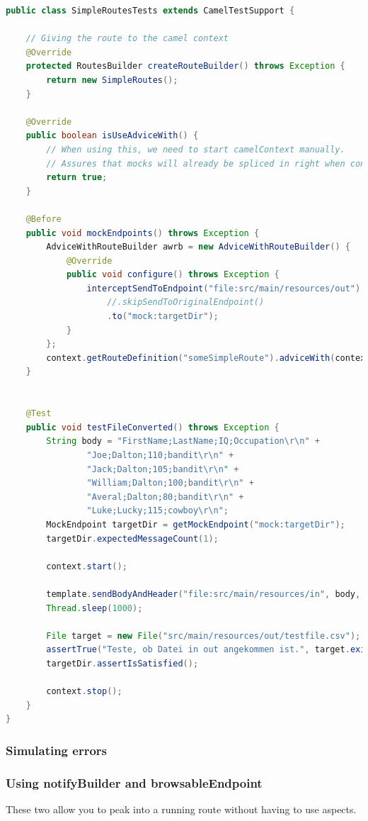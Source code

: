 \begin{lstlisting}[language=java]
public class SimpleRoutesTests extends CamelTestSupport {
	
	// Giving the route to the camel context
	@Override
	protected RoutesBuilder createRouteBuilder() throws Exception {
		return new SimpleRoutes();
	}
	
	@Override
	public boolean isUseAdviceWith() {
		// When using this, we need to start camelContext manually.
		// Assures that mocks will already be spliced in right when context starts.
		return true; 
	}
	
	@Before
	public void mockEndpoints() throws Exception {
		AdviceWithRouteBuilder awrb = new AdviceWithRouteBuilder() {
			@Override
			public void configure() throws Exception {
				interceptSendToEndpoint("file:src/main/resources/out")
					//.skipSendToOriginalEndpoint()
					.to("mock:targetDir");
			}
		};
		context.getRouteDefinition("someSimpleRoute").adviceWith(context, awrb);
	}
	
	
	@Test
	public void testFileConverted() throws Exception {
		String body = "FirstName;LastName;IQ;Occupation\r\n" + 
				"Joe;Dalton;110;bandit\r\n" + 
				"Jack;Dalton;105;bandit\r\n" + 
				"William;Dalton;100;bandit\r\n" + 
				"Averal;Dalton;80;bandit\r\n" + 
				"Luke;Lucky;115;cowboy\r\n";
		MockEndpoint targetDir = getMockEndpoint("mock:targetDir");
		targetDir.expectedMessageCount(1);
		
		context.start();
		
		template.sendBodyAndHeader("file:src/main/resources/in", body, Exchange.FILE_NAME, "testfile.csv");
		Thread.sleep(1000);
		
		File target = new File("src/main/resources/out/testfile.csv");
		assertTrue("Teste, ob Datei in out angekommen ist.", target.exists());
		targetDir.assertIsSatisfied();
		
		context.stop();
	}
}
\end{lstlisting}

\subsubsection{Simulating errors}

\subsubsection{Using notifyBuilder and browsableEndpoint}
These two allow you to peak into a running route without having to use aspects.